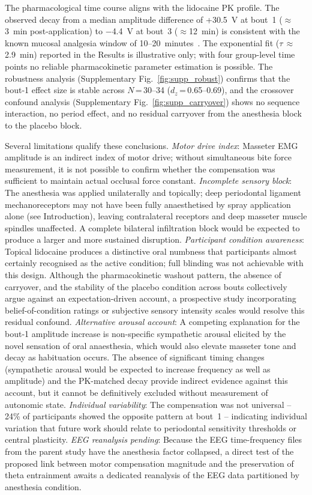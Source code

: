 The pharmacological time course aligns with the lidocaine PK profile.
The observed decay from a median amplitude difference of +30.5~\textmu{}V
at bout~1 ($\approx$3~min post-application) to $-$4.4~\textmu{}V at bout~3
($\approx$12~min) is consistent with the known mucosal analgesia window of
10--20~minutes~\cite{vonGunten2019}.
The exponential fit ($\tau$\,$\approx$\,2.9~min) reported in the Results is
illustrative only; with four group-level time points no reliable pharmacokinetic
parameter estimation is possible.
The robustness analysis (Supplementary Fig.~\ref{fig:supp_robust}) confirms
that the bout-1 effect size is stable across $N$\,=\,30--34 ($d_z$\,=\,0.65--0.69),
and the crossover confound analysis (Supplementary Fig.~\ref{fig:supp_carryover})
shows no sequence interaction, no period effect, and no residual carryover
from the anesthesia block to the placebo block.

Several limitations qualify these conclusions.
\textit{Motor drive index}: Masseter EMG amplitude is an indirect index of
motor drive; without simultaneous bite force measurement, it is not possible
to confirm whether the compensation was sufficient to maintain actual occlusal
force constant.
\textit{Incomplete sensory block}: The anesthesia was applied unilaterally and
topically; deep periodontal ligament mechanoreceptors may not have been fully
anaesthetised by spray application alone (see Introduction), leaving contralateral
receptors and deep masseter muscle spindles unaffected.
A complete bilateral infiltration block would be expected to produce a larger
and more sustained disruption.
\textit{Participant condition awareness}: Topical lidocaine produces a distinctive
oral numbness that participants almost certainly recognised as the active
condition; full blinding was not achievable with this design.
Although the pharmacokinetic washout pattern, the absence of carryover, and
the stability of the placebo condition across bouts collectively argue against
an expectation-driven account, a prospective study incorporating
belief-of-condition ratings or subjective sensory intensity scales would
resolve this residual confound.
\textit{Alternative arousal account}: A competing explanation for the
bout-1 amplitude increase is non-specific sympathetic arousal elicited by
the novel sensation of oral anaesthesia, which would also elevate masseter
tone and decay as habituation occurs.
The absence of significant timing changes (sympathetic arousal would be
expected to increase frequency as well as amplitude) and the PK-matched decay
provide indirect evidence against this account, but it cannot be definitively
excluded without measurement of autonomic state.
\textit{Individual variability}: The compensation was not universal -- 24\% of
participants showed the opposite pattern at bout~1 -- indicating individual
variation that future work should relate to periodontal sensitivity thresholds
or central plasticity.
\textit{EEG reanalysis pending}: Because the EEG time-frequency files from the
parent study have the anesthesia factor collapsed, a direct test of the proposed
link between motor compensation magnitude and the preservation of theta
entrainment awaits a dedicated reanalysis of the EEG data partitioned by
anesthesia condition.

